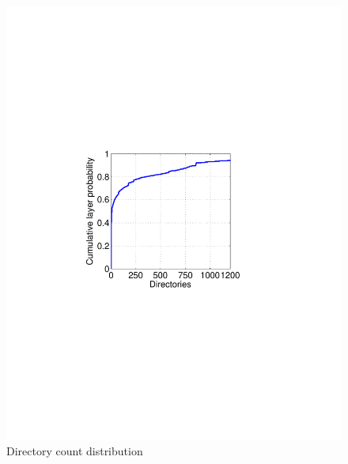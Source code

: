 \begin{figure}
	\centering
	\begin{minipage}{0.25\textwidth}
		\centering
		\includegraphics[width=1\textwidth]{graphs/dir_cnt.pdf}
		\caption{Directory count distribution}
		\label{fig_dir_cnt}
	\end{minipage}%
	\begin{minipage}{0.26\textwidth}
		\centering

\end{minipage}
\end{figure}
